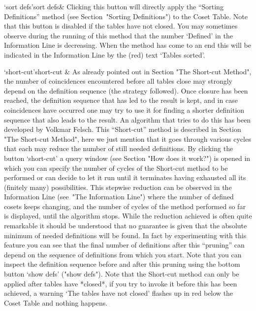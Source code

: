 \>`sort defs'{sort defs}&
  Clicking this button will directly apply the ``Sorting
  Definitions'' method (see Section~"Sorting Definitions") to the Coset
  Table. Note that this button is disabled if the tables have not
  closed. You may sometimes observe during the running of this method
  that the number `Defined' in the Information Line is decreasing. When
  the method has come to an end this will be indicated in the
  Information Line by the (red) text `Tables sorted'.


\>`short-cut'{short-cut} &
  As already pointed out in Section "The Short-cut Method", the number of
  coincidences encountered before all tables close may strongly depend
  on the definition sequence (the strategy followed). Once closure has
  been reached, the definition sequence that has led to the result is
  kept, and in case coincidences have occurred one may try to use it for
  finding a shorter definition sequence that also leads to the result.
  An algorithm that tries to do this has been developed by Volkmar
  Felsch. This ``Short-cut'' method is described in Section "The
  Short-cut Method", here we just mention that it goes through various
  cycles that each may reduce the number of still needed definitions.
  By clicking the button `short-cut' a query window (see Section "How
  does it work?") is opened in which you can specify the number of
  cycles of the Short-cut method to be performed or can decide to let it
  run until it terminates having exhausted all its (finitely many)
  possibilities. This stepwise reduction can be observed in the
  Information Line (see~"The Information Line") where the number of
  defined cosets keeps changing, and the number of cycles of the method
  performed so far is displayed, until the algorithm stops. While the
  reduction achieved is often quite remarkable it should be understood
  that no guarantee is given that the absolute minimum of needed
  definitions will be found. In fact by experimenting with this feature
  you can see that the final number of definitions after this ``pruning''
  can depend on the sequence of definitions from which you start. Note
  that you can inspect the definition sequence before and after this
  pruning using the bottom button `show defs' ("show defs"). Note that
  the Short-cut method can only be applied after tables have *closed*,
  if you try to invoke it before this has been achieved, a warning `The
  tables have not closed' flashes up in red below the Coset Table and
  nothing happens.

\enditems

